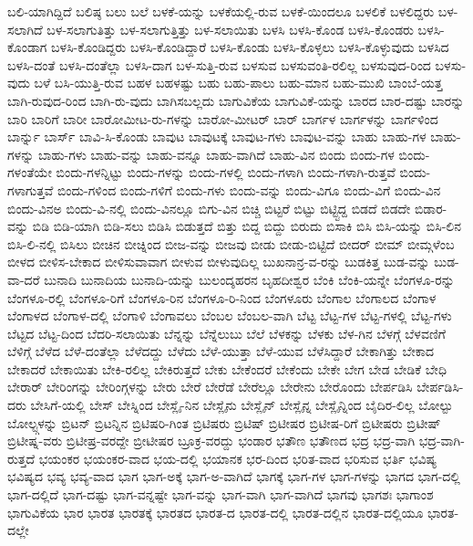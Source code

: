 {ಬಲಿ-ಯಾಗಿದ್ದಿದೆ
ಬಲಿಷ್ಠ
ಬಲು
ಬಲೆ
ಬಳಕೆ-ಯನ್ನು
ಬಳಕೆಯಲ್ಲಿ-ರುವ
ಬಳಕೆ-ಯಿಂದಲೂ
ಬಳಲಿಕೆ
ಬಳಲಿದ್ದರು
ಬಳ-ಸಲಾಗಿದೆ
ಬಳ-ಸಲಾಗುತಿತ್ತು
ಬಳ-ಸಲಾಗುತ್ತಿತ್ತು
ಬಳ-ಸಲಾಯಿತು
ಬಳಸಿ
ಬಳಸಿ-ಕೊಂಡ
ಬಳಸಿ-ಕೊಂಡರು
ಬಳಸಿ-ಕೊಂಡಾಗ
ಬಳಸಿ-ಕೊಂಡಿದ್ದರು
ಬಳಸಿ-ಕೊಂಡಿದ್ದಾರೆ
ಬಳಸಿ-ಕೊಂಡು
ಬಳಸಿ-ಕೊಳ್ಳಲು
ಬಳಸಿ-ಕೊಳ್ಳುವುದು
ಬಳಸಿದ
ಬಳಸಿ-ದಂತೆ
ಬಳಸಿ-ದಂತೆಲ್ಲಾ
ಬಳಸಿ-ದಾಗ
ಬಳ-ಸುತ್ತಿ-ರುವ
ಬಳಸುವ
ಬಳಸುವಂತಿ-ರಲಿಲ್ಲ
ಬಳಸುವುದ-ರಿಂದ
ಬಳಸು-ವುದು
ಬಳೆ
ಬಸಿ-ಯುತ್ತಿ-ರುವ
ಬಹಳ
ಬಹಳಷ್ಟು
ಬಹು
ಬಹು-ಪಾಲು
ಬಹು-ಮಾನ
ಬಹು-ಮುಖಿ
ಬಾಂಬೆ-ಯತ್ತ
ಬಾಗಿ-ರುವುದ-ರಿಂದ
ಬಾಗಿ-ರು-ವುದು
ಬಾಗಿಸಬಲ್ಲದು
ಬಾಗುವಿಕೆಯ
ಬಾಗುವಿಕೆ-ಯನ್ನು
ಬಾರದ
ಬಾರ-ದಷ್ಟು
ಬಾರನ್ನು
ಬಾರಿ
ಬಾರಿಗೆ
ಬಾರೀ
ಬಾರೋಮೀಟ-ರು-ಗಳನ್ನು
ಬಾರೋ-ಮೀಟರ್
ಬಾರ್
ಬಾರ್ಗಳ
ಬಾರ್ಗಳನ್ನು
ಬಾರ್ಗಳಿಂದ
ಬಾರ್ನ್ನು
ಬಾರ್ಸ್
ಬಾವಿ-ಸಿ-ಕೊಂಡು
ಬಾವುಟ
ಬಾವುಟಕ್ಕೆ
ಬಾವುಟ-ಗಳು
ಬಾವುಟ-ವನ್ನು
ಬಾಹು
ಬಾಹು-ಗಳ
ಬಾಹು-ಗಳನ್ನು
ಬಾಹು-ಗಳು
ಬಾಹು-ವನ್ನು
ಬಾಹು-ವನ್ನೂ
ಬಾಹು-ವಾಗಿದೆ
ಬಾಹು-ವಿನ
ಬಿಂದು
ಬಿಂದು-ಗಳ
ಬಿಂದು-ಗಳಂತೆಯೇ
ಬಿಂದು-ಗಳನ್ನಿಟ್ಟು
ಬಿಂದು-ಗಳನ್ನು
ಬಿಂದು-ಗಳಲ್ಲಿ
ಬಿಂದು-ಗಳಾಗಿ
ಬಿಂದು-ಗಳಾಗಿ-ರುತ್ತವೆ
ಬಿಂದು-ಗಳಾಗುತ್ತವೆ
ಬಿಂದು-ಗಳಿಂದ
ಬಿಂದು-ಗಳಿಗೆ
ಬಿಂದು-ಗಳು
ಬಿಂದು-ವನ್ನು
ಬಿಂದು-ವಿಗೂ
ಬಿಂದು-ವಿಗೆ
ಬಿಂದು-ವಿನ
ಬಿಂದು-ವಿನಅ
ಬಿಂದು-ವಿ-ನಲ್ಲಿ
ಬಿಂದು-ವಿನಲ್ಲೂ
ಬಿಗು-ವಿನ
ಬಿಚ್ಚಿ
ಬಿಟ್ಟರೆ
ಬಿಟ್ಟು
ಬಿಟ್ಟ್ಟಿದ್ದ
ಬಿಡದೆ
ಬಿಡದೇ
ಬಿಡಾರ-ವನ್ನು
ಬಿಡಿ
ಬಿಡಿ-ಯಾಗಿ
ಬಿಡಿ-ಸಲು
ಬಿಡಿಸಿ
ಬಿಡುತ್ತದೆ
ಬಿತ್ತು
ಬಿದ್ದ
ಬಿದ್ದು
ಬಿರುದು
ಬಿಸಾಕಿ
ಬಿಸಿ
ಬಿಸಿ-ಯನ್ನು
ಬಿಸಿ-ಲಿನ
ಬಿಸಿ-ಲಿ-ನಲ್ಲಿ
ಬಿಸಿಲು
ಬೀಚಿನ
ಬೀಚ್ನಿಂದ
ಬೀಜ-ವನ್ನು
ಬೀಜವು
ಬೀಡು
ಬೀಡು-ಬಿಟ್ಟಿದೆ
ಬೀದರ್
ಬೀಮ್
ಬೀಮ್ಗಳೆಂಬ
ಬೀಳದ
ಬೀಳಿಸ-ಬೇಕಾದ
ಬೀಳಿಸುವಾವಾಗ
ಬೀಳುವ
ಬೀಳುವುದಿಲ್ಲ
ಬುಖನಾನ್ರ-ವ-ರನ್ನು
ಬುಡಕಿತ್ತ
ಬುಡ-ವನ್ನು
ಬುಡ-ವಾ-ದರೆ
ಬುನಾದಿ
ಬುನಾದಿಯ
ಬುನಾದಿ-ಯನ್ನು
ಬುಲಂದ್ಶಹರನ
ಬೃಹದೀಶ್ವರ
ಬೆಂಕಿ
ಬೆಂಕಿ-ಯನ್ನೇ
ಬೆಂಗಳೂ-ರನ್ನು
ಬೆಂಗಳೂ-ರಲ್ಲಿ
ಬೆಂಗಳೂ-ರಿಗೆ
ಬೆಂಗಳೂ-ರಿನ
ಬೆಂಗಳೂ-ರಿ-ನಿಂದ
ಬೆಂಗಳೂರು
ಬೆಂಗಾಲ
ಬೆಂಗಾಲದ
ಬೆಂಗಾಳ
ಬೆಂಗಾಳದ
ಬೆಂಗಾಳ-ದಲ್ಲಿ
ಬೆಂಗಾಳಿ
ಬೆಂಗಾವಲು
ಬೆಂಬಲ
ಬೆಂಬಲ-ವಾಗಿ
ಬೆಟ್ಟ
ಬೆಟ್ಟ-ಗಳ
ಬೆಟ್ಟ-ಗಳಲ್ಲಿ
ಬೆಟ್ಟ-ಗಳು
ಬೆಟ್ಟದ
ಬೆಟ್ಟ-ದಿಂದ
ಬೆದರಿ-ಸಲಾಯಿತು
ಬೆನ್ನನ್ನು
ಬೆನ್ನೆಲುಬು
ಬೆಲೆ
ಬೆಳಕನ್ನು
ಬೆಳಕು
ಬೆಳ-ಗಿನ
ಬೆಳಗ್ಗೆ
ಬೆಳವಣಿಗೆ
ಬೆಳಿಗ್ಗೆ
ಬೆಳೆದ
ಬೆಳೆ-ದಂತೆಲ್ಲಾ
ಬೆಳೆದದ್ದು
ಬೆಳೆದು
ಬೆಳೆ-ಯುತ್ತಾ
ಬೆಳೆ-ಯುವ
ಬೆಳೆಸಿದ್ದಾರೆ
ಬೇಕಾಗಿತ್ತು
ಬೇಕಾದ
ಬೇಕಾದರೆ
ಬೇಕಾಯಿತು
ಬೇಕಿ-ರಲಿಲ್ಲ
ಬೇಕಿರುತ್ತದೆ
ಬೇಕು
ಬೇಕೆಂದರೆ
ಬೇಕೆಂದು
ಬೇಕೇ
ಬೇಗ
ಬೇಡ
ಬೇಡಿಕೆ
ಬೇಧಿ
ಬೇರಾರ್
ಬೇರಿಂಗನ್ನು
ಬೇರಿಂಗ್ಗಳನ್ನು
ಬೇರು
ಬೇರೆ
ಬೇರೆಡೆ
ಬೇರೆಲ್ಲೂ
ಬೇರೇನು
ಬೇರೊಂದು
ಬೇರ್ಪಡಿಸಿ
ಬೇರ್ಪಡಿಸಿ-ದರು
ಬೇಸಿಗೆ-ಯಲ್ಲಿ
ಬೇಸ್
ಬೇಸ್ನಿಂದ
ಬೇಸ್ಲೈ-ನಿನ
ಬೇಸ್ಲೈನು
ಬೇಸ್ಲೈನ್
ಬೇಸ್ಲೈನ್ನ
ಬೇಸ್ಲೈನ್ನಿಂದ
ಬೈದಿರ-ಲಿಲ್ಲ
ಬೋಲ್ಟು
ಬೋಲ್ಟ್ಗಳನ್ನು
ಬ್ರಿಟನ್
ಬ್ರಿಟನ್ನಿನ
ಬ್ರಿಟಿಷರಿ-ಗಿಂತ
ಬ್ರಿಟಿಷರು
ಬ್ರಿಟಿಷ್
ಬ್ರಿಟೀಷರ
ಬ್ರಿಟೀಷ-ರಿಗೆ
ಬ್ರಿಟೀಷರು
ಬ್ರಿಟೀಷ್
ಬ್ರಿಟೀಷ್ನ-ವರು
ಬ್ರಿಟೀಷ್ರ-ವರದ್ದೇ
ಬ್ರೀಟೀಷರ
ಬ್ರೂಕ್ರ-ವರದ್ದು
ಭಂಡಾರ
ಭತೌಣ
ಭತೌಣದ
ಭದ್ರ
ಭದ್ರ-ವಾಗಿ
ಭದ್ರ-ವಾಗಿ-ರುತ್ತದೆ
ಭಯಂಕರ
ಭಯಂಕರ-ವಾದ
ಭಯ-ದಲ್ಲಿ
ಭಯಾನಕ
ಭರ-ದಿಂದ
ಭರಿತ-ವಾದ
ಭರಿಸುವ
ಭರ್ತಿ
ಭವಿಷ್ಯ
ಭವಿಷ್ಯದ
ಭವ್ಯ
ಭವ್ಯ-ವಾದ
ಭಾಗ
ಭಾಗ-ಅಕ್ಕೆ
ಭಾಗ-ಅ-ವಾಗಿದೆ
ಭಾಗಕ್ಕೆ
ಭಾಗ-ಗಳ
ಭಾಗ-ಗಳನ್ನು
ಭಾಗದ
ಭಾಗ-ದಲ್ಲಿ
ಭಾಗ-ದಲ್ಲಿದೆ
ಭಾಗ-ದಷ್ಟು
ಭಾಗ-ವನ್ನಷ್ಟೇ
ಭಾಗ-ವನ್ನು
ಭಾಗ-ವಾಗಿ
ಭಾಗ-ವಾಗಿದೆ
ಭಾಗವು
ಭಾಗಶಃ
ಭಾಗಾಂಶ
ಭಾಗುವಿಕೆಯ
ಭಾರ
ಭಾರತ
ಭಾರತಕ್ಕೆ
ಭಾರತದ
ಭಾರತ-ದ
ಭಾರತ-ದಲ್ಲಿ
ಭಾರತ-ದಲ್ಲಿನ
ಭಾರತ-ದಲ್ಲಿಯೂ
ಭಾರತ-ದಲ್ಲೇ
}
